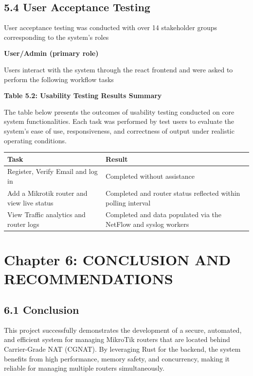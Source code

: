 \documentclass[12pt,a4paper,oneside]{report}
\begin{document}
\section{5.4 User Acceptance Testing}

User acceptance testing was conducted with over 14 stakeholder groups corresponding to the system's roles


\textbf{User/Admin (primary role)}


Users interact with the system through the react frontend and were asked to perform the following workflow tasks


\textbf{Table 5.2: Usability Testing Results Summary}


The table below presents the outcomes of usability testing conducted on core system functionalities. Each task was performed by test users to evaluate the system's ease of use, responsiveness, and correctness of output under realistic operating conditions.


\begin{table}[htbp]
  \centering
  {\small
  \begin{tabular}{|p{6.66cm}|p{8.00cm}|}
    \hline
    Task & Result \\
    \hline
    Register, Verify Email and log in & Completed without assistance \\
    Add a Mikrotik router and view live status & Completed and router status reflected within polling interval \\
    View Traffic analytics and router logs & Completed and data populated via the NetFlow and syslog workers \\
    \hline
  \end{tabular}
  }
\end{table}



\chapter{Chapter 6: CONCLUSION AND RECOMMENDATIONS}

\section{6.1 Conclusion}

This project successfully demonstrates the development of a secure, automated, and efficient system for managing MikroTik routers that are located behind Carrier-Grade NAT (CGNAT). By leveraging Rust for the backend, the system benefits from high performance, memory safety, and concurrency, making it reliable for managing multiple routers simultaneously.
\end{document}
